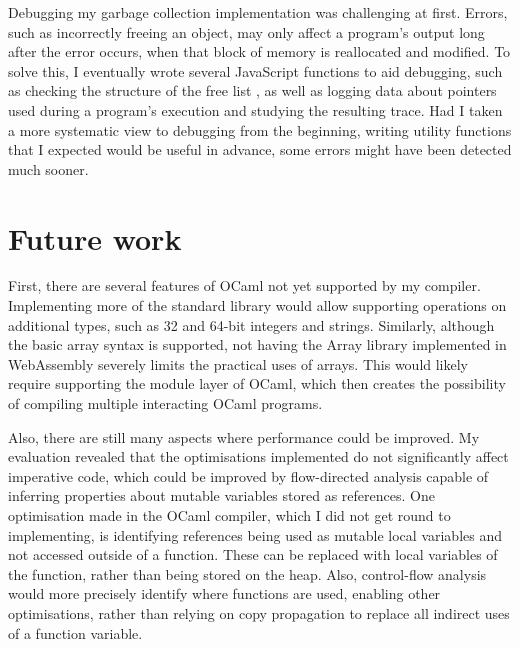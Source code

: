 Debugging my garbage collection implementation was challenging at first.
Errors, such as incorrectly freeing an object, may only affect a program's output long after the error occurs, when that block of memory is reallocated and modified. To solve this, I eventually wrote several JavaScript functions to aid debugging, such as checking the structure of the free list%
, as well as logging data about pointers used during a program's execution and studying the resulting trace. 
Had I taken a more systematic view to debugging from the beginning, writing utility functions that I expected would be useful in advance, some errors might have been detected much sooner.


\section{Future work}
First, there are several features of OCaml not yet supported by my compiler. Implementing more of the standard library would allow supporting operations on additional types, such as 32 and 64-bit integers and strings.
Similarly, although the basic array syntax is supported, not having the Array library implemented in WebAssembly severely limits the practical uses of arrays. This would likely require supporting the module layer of OCaml, which then creates the possibility of compiling multiple interacting OCaml programs.


Also, there are still many aspects where performance could be improved. 
My evaluation revealed that the optimisations implemented do not significantly affect imperative code, which could be improved by flow-directed analysis capable of inferring properties about mutable variables stored as references.
%
One optimisation made in the OCaml compiler, which I did not get round to implementing, is identifying references being used as mutable local variables and not accessed outside of a function. These can be replaced with local variables of the function, rather than being stored on the heap.
Also, control-flow analysis would more precisely identify where functions are used, enabling other optimisations, rather than relying on copy propagation to replace all indirect uses of a function variable.

